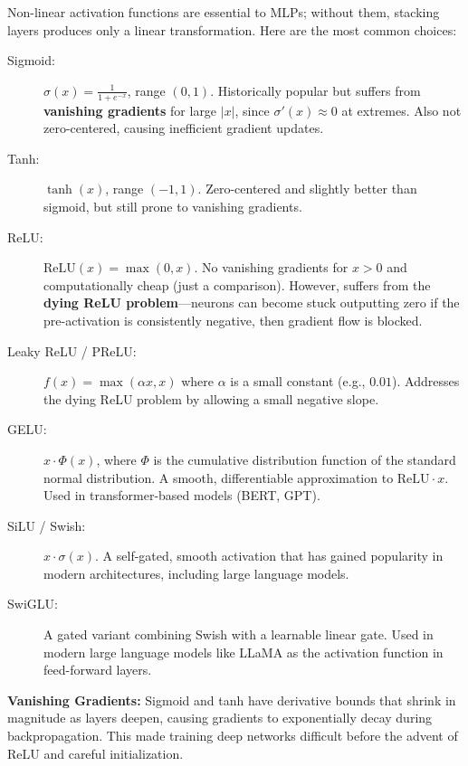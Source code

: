 Non-linear activation functions are essential to MLPs; without them, stacking layers produces only a linear transformation. Here are the most common choices:

\begin{description}
  \item[Sigmoid:] $\sigma(x) = \frac{1}{1 + e^{-x}}$, range $(0, 1)$. Historically popular but suffers from \textbf{vanishing gradients} for large $|x|$, since $\sigma'(x) \approx 0$ at extremes. Also not zero-centered, causing inefficient gradient updates.

  \item[Tanh:] $\tanh(x)$, range $(-1, 1)$. Zero-centered and slightly better than sigmoid, but still prone to vanishing gradients.

  \item[ReLU:] $\text{ReLU}(x) = \max(0, x)$. No vanishing gradients for $x > 0$ and computationally cheap (just a comparison). However, suffers from the \textbf{dying ReLU problem}---neurons can become stuck outputting zero if the pre-activation is consistently negative, then gradient flow is blocked.

  \item[Leaky ReLU / PReLU:] $f(x) = \max(\alpha x, x)$ where $\alpha$ is a small constant (e.g., $0.01$). Addresses the dying ReLU problem by allowing a small negative slope.

  \item[GELU:] $x \cdot \Phi(x)$, where $\Phi$ is the cumulative distribution function of the standard normal distribution. A smooth, differentiable approximation to $\text{ReLU} \cdot x$. Used in transformer-based models (BERT, GPT).

  \item[SiLU / Swish:] $x \cdot \sigma(x)$. A self-gated, smooth activation that has gained popularity in modern architectures, including large language models.

  \item[SwiGLU:] A gated variant combining Swish with a learnable linear gate. Used in modern large language models like LLaMA as the activation function in feed-forward layers.
\end{description}

\begin{warnbox}
\textbf{Vanishing Gradients:} Sigmoid and tanh have derivative bounds that shrink in magnitude as layers deepen, causing gradients to exponentially decay during backpropagation. This made training deep networks difficult before the advent of ReLU and careful initialization.
\end{warnbox}


